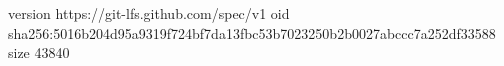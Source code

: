 version https://git-lfs.github.com/spec/v1
oid sha256:5016b204d95a9319f724bf7da13fbc53b7023250b2b0027abccc7a252df33588
size 43840
